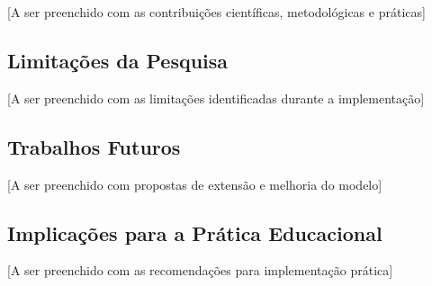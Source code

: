 \documentclass[12pt,a4paper]{article}
\begin{document}
[A ser preenchido com as contribuições científicas, metodológicas e práticas]

\subsection{Limitações da Pesquisa}

[A ser preenchido com as limitações identificadas durante a implementação]

\subsection{Trabalhos Futuros}

[A ser preenchido com propostas de extensão e melhoria do modelo]

\subsection{Implicações para a Prática Educacional}

[A ser preenchido com as recomendações para implementação prática]

\end{document}
